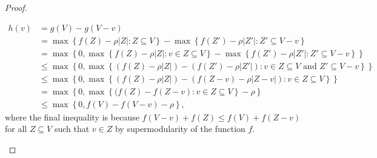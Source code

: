 \documentclass{article}
\begin{document}
\begin{proof}
\begin{enumerate}
    \begin{align*}
        h(v)& = g(V) - g(V - v)\\
        &= \max\left\{f(Z) - \rho|Z|: Z \subseteq V \right\} - \max \left\{f(Z') - \rho|Z'| :  Z' \subseteq V - v\right\} \\
        &= \max \left\{0, \max\left\{f(Z) - \rho|Z|: v \in Z \subseteq V \right\} - \max \left\{f(Z') - \rho|Z'| :  Z' \subseteq V - v\right\}\right\} \\
        & \leq \max\left\{0 , \max\left\{(f(Z) - \rho|Z|) - (f(Z') - \rho|Z'|) : v \in Z\subseteq V \text{ and } Z' \subseteq V - v\right\}\right\}\\
        & \leq \max\left\{0 , \max\left\{(f(Z) - \rho|Z|) - (f(Z-v) - \rho|Z-v|) : v \in Z\subseteq V\right\}\right\} \\
        & = \max\left\{0 , \max\left\{(f(Z) - f(Z-v) : v \in Z\subseteq V \right\} - \rho\right\}\\
        & \leq \max\left\{0, f(V) - f(V - v) - \rho\right\},
    \end{align*}
    where the final inequality is because $f(V - v) + f(Z) \leq f(V) + f(Z - v)$ for all $Z \subseteq V$ such that $v \in Z$ by supermodularity of the function $f$.
\end{enumerate}
\end{proof}
\end{document}
